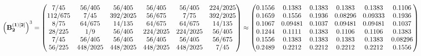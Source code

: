 \documentclass[10pt,a4paper]{article}
\begin{document}
	\[
		\left(\bold{B_2^{(1)[2]}}\right)^{3} = 
		\begin{pmatrix}
			{{7}} / {{45}} & {{56}} / {{405}} & {{56}} / {{405}} & {{56}} / {{405}} & {{56}} / {{405}} & {{224}} / {{2025}} \\
			{{112}} / {{675}} & {{7}} / {{45}} & {{392}} / {{2025}} & {{56}} / {{675}} & {{7}} / {{75}} & {{392}} / {{2025}} \\
			{{8}} / {{75}} & {{64}} / {{675}} & {{14}} / {{135}} & {{64}} / {{675}} & {{64}} / {{675}} & {{14}} / {{135}} \\
			{{28}} / {{225}} & {1} / {{9}} & {{56}} / {{405}} & {{224}} / {{2025}} & {{224}} / {{2025}} & {{56}} / {{405}} \\
			{{7}} / {{45}} & {{56}} / {{405}} & {{56}} / {{405}} & {{56}} / {{405}} & {{56}} / {{405}} & {{56}} / {{675}} \\
			{{56}} / {{225}} & {{448}} / {{2025}} & {{448}} / {{2025}} & {{448}} / {{2025}} & {{448}} / {{2025}} & {{7}} / {{45}} \\
		\end{pmatrix}
		\approx
		\begin{pmatrix}
			0.1556   & 0.1383   & 0.1383   & 0.1383   & 0.1383   & 0.1106   \\
			0.1659   & 0.1556   & 0.1936   & 0.08296  & 0.09333  & 0.1936   \\
			0.1067   & 0.09481  & 0.1037   & 0.09481  & 0.09481  & 0.1037   \\
			0.1244   & 0.1111   & 0.1383   & 0.1106   & 0.1106   & 0.1383   \\
			0.1556   & 0.1383   & 0.1383   & 0.1383   & 0.1383   & 0.08296  \\
			0.2489   & 0.2212   & 0.2212   & 0.2212   & 0.2212   & 0.1556   \\
		\end{pmatrix}
	\]
\end{document}
